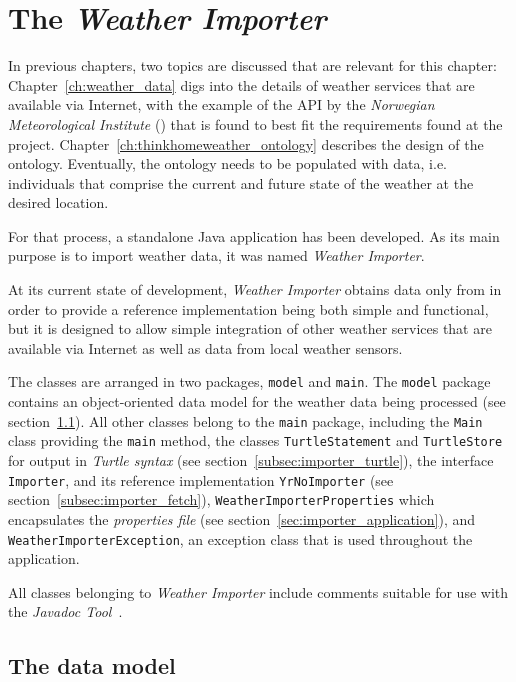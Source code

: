 \chapter{The \emph{Weather Importer}}
\label{ch:weather_importer}

In previous chapters, two topics are discussed that are relevant for this chapter: Chapter~\ref{ch:weather_data} digs into the details of weather services that are available via Internet, with the example of the API by the \emph{Norwegian Meteorological Institute} (\yrno) that is found to best fit the requirements found at the \thinkhome project. Chapter~\ref{ch:thinkhomeweather_ontology} describes the design of the \thinkhomeweather ontology. Eventually, the ontology needs to be populated with data, i.e. individuals that comprise the current and future state of the weather at the desired location.

For that process, a standalone Java application has been developed. As its main purpose is to import weather data, it was named \emph{Weather Importer}.

At its current state of development, \emph{Weather Importer} obtains data only from \yrno in order to provide a reference implementation being both simple and functional, but it is designed to allow simple integration of other weather services that are available via Internet as well as data from local weather sensors.

The classes are arranged in two packages, \texttt{model} and \texttt{main}. The \texttt{model} package contains an object-oriented data model for the weather data being processed (see section~\ref{sec:importer_model}). All other classes belong to the \texttt{main} package, including the \texttt{Main} class providing the \texttt{main} method, the classes \texttt{TurtleStatement} and \texttt{TurtleStore} for output in \emph{Turtle syntax}\cite{Turtle} (see section~\ref{subsec:importer_turtle}), the interface \texttt{Importer}, and its reference implementation \texttt{YrNoImporter} (see section~\ref{subsec:importer_fetch}), \texttt{WeatherImporterProperties} which encapsulates the \emph{properties file} (see section~\ref{sec:importer_application}), and \texttt{WeatherImporterException}, an exception class that is used throughout the application.

All classes belonging to \emph{Weather Importer} include comments suitable for use with the \emph{Javadoc Tool}~\cite{javadoc}.

\section{The data model}
\label{sec:importer_model}


